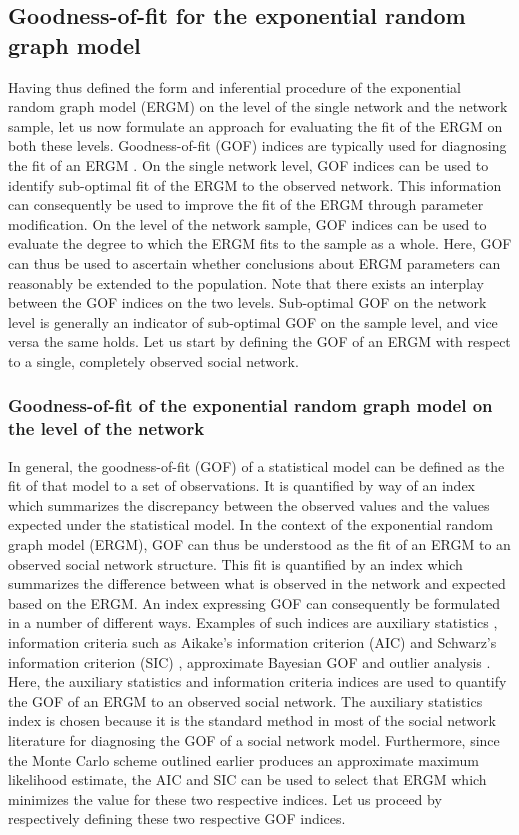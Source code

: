 \documentclass[a4paper, man]{apa6}
\begin{document}
\subsection{Goodness-of-fit for the exponential random graph model}
Having thus defined the form and inferential procedure of the exponential random graph model (ERGM) on the level of the single network and the network sample, let us now formulate an approach for evaluating the fit of the ERGM on both these levels. \clearpage \noindent Goodness-of-fit (GOF) indices are typically used for diagnosing the fit of an ERGM \cite{lusher2013exponential}. On the single network level, GOF indices can be used to identify sub-optimal fit of the ERGM to the observed network. This information can consequently be used to improve the fit of the ERGM through parameter modification. On the level of the network sample, GOF indices can be used to evaluate the degree to which the ERGM fits to the sample as a whole. Here, GOF can thus be used to ascertain whether conclusions about ERGM parameters can reasonably be extended to the population. Note that there exists an interplay between the GOF indices on the two levels. Sub-optimal GOF on the network level is generally an indicator of sub-optimal GOF on the sample level, and vice versa the same holds. Let us start by defining the GOF of an ERGM with respect to a single, completely observed social network. 
\\
\subsubsection{Goodness-of-fit of the exponential random graph model on the level of the network} In general, the goodness-of-fit (GOF) of a statistical model can be defined as the fit of that model to a set of observations. It is quantified by way of an index which summarizes the discrepancy between the observed values and the values expected under the statistical model. In the context of the exponential random graph model (ERGM), GOF can thus be understood as the fit of an ERGM to an observed social network structure. This fit is quantified by an index which summarizes the difference between what is observed in the network and expected based on the ERGM. An index expressing GOF can consequently be formulated in a number of different ways. Examples of such indices are auxiliary statistics \cite{hunter2008goodness}, information criteria such as Aikake's information criterion (AIC) \cite{akaike1974new} and Schwarz's information criterion (SIC) \cite{schwarz1978estimating}, approximate Bayesian GOF \cite{lusher2013exponential} and outlier analysis \cite{koskinen2018outliers}. Here, the auxiliary statistics and information criteria indices are used to quantify the GOF of an ERGM to an observed social network. The auxiliary statistics index is chosen because it is the standard method in most of the social network literature for diagnosing the GOF of a social network model. \clearpage \noindent Furthermore, since the Monte Carlo scheme outlined earlier produces an approximate maximum likelihood estimate, the AIC and SIC can be used to select that ERGM which minimizes the value for these two respective indices. Let us proceed by respectively defining these two respective GOF indices. 
\\
\end{document}
